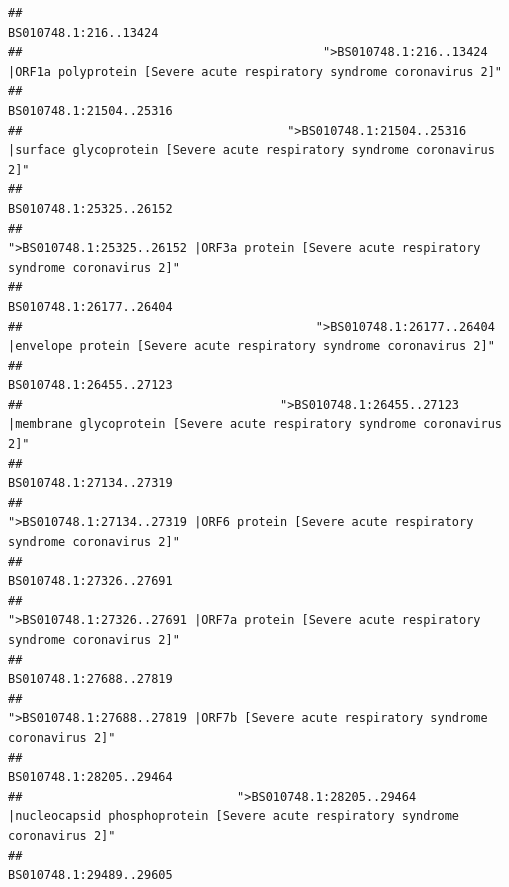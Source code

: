 \documentclass[
]{article}
\begin{document}
\begin{verbatim}
##                                                                                                                  BS010748.1:216..13424 
##                                          ">BS010748.1:216..13424 |ORF1a polyprotein [Severe acute respiratory syndrome coronavirus 2]" 
##                                                                                                                BS010748.1:21504..25316 
##                                     ">BS010748.1:21504..25316 |surface glycoprotein [Severe acute respiratory syndrome coronavirus 2]" 
##                                                                                                                BS010748.1:25325..26152 
##                                            ">BS010748.1:25325..26152 |ORF3a protein [Severe acute respiratory syndrome coronavirus 2]" 
##                                                                                                                BS010748.1:26177..26404 
##                                         ">BS010748.1:26177..26404 |envelope protein [Severe acute respiratory syndrome coronavirus 2]" 
##                                                                                                                BS010748.1:26455..27123 
##                                    ">BS010748.1:26455..27123 |membrane glycoprotein [Severe acute respiratory syndrome coronavirus 2]" 
##                                                                                                                BS010748.1:27134..27319 
##                                             ">BS010748.1:27134..27319 |ORF6 protein [Severe acute respiratory syndrome coronavirus 2]" 
##                                                                                                                BS010748.1:27326..27691 
##                                            ">BS010748.1:27326..27691 |ORF7a protein [Severe acute respiratory syndrome coronavirus 2]" 
##                                                                                                                BS010748.1:27688..27819 
##                                                    ">BS010748.1:27688..27819 |ORF7b [Severe acute respiratory syndrome coronavirus 2]" 
##                                                                                                                BS010748.1:28205..29464 
##                              ">BS010748.1:28205..29464 |nucleocapsid phosphoprotein [Severe acute respiratory syndrome coronavirus 2]" 
##                                                                                                                BS010748.1:29489..29605 

\end{verbatim}
\end{document}
